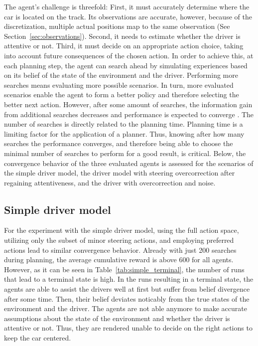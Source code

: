 
The agent's challenge is threefold: First, it must accurately determine where the car is located on the track. Its observations are accurate, however, because of the discretization, multiple actual positions map to the same observation (See Section~\ref{sec:observations}). Second, it needs to estimate whether the driver is attentive or not. Third, it must decide on an appropriate action choice, taking into account future consequences of the chosen action. In order to achieve this, at each planning step, the agent can search ahead by simulating experiences based on its belief of the state of the environment and the driver. Performing more searches means evaluating more possible scenarios. In turn, more evaluated scenarios enable the agent to form a better policy and therefore selecting the better next action. However, after some amount of searches, the information gain from additional searches decreases and performance is expected to converge \parencite{pomcp}. The number of searches is directly related to the planning time. Planning time is a limiting factor for the application of a planner. Thus, knowing after how many searches the performance converges, and therefore being able to choose the minimal number of searches to perform for a good result, is critical. Below, the convergence behavior of the three evaluated agents is assessed for the scenarios of the simple driver model, the driver model with steering overcorrection after regaining attentiveness, and the driver with overcorrection and noise.

\subsection{Simple driver model}

For the experiment with the simple driver model, using the full action space, utilizing only the subset of minor steering actions, and employing preferred actions lead to similar convergence behavior. Already with just 200 searches during planning, the average cumulative reward is above 600 for all agents. However, as it can be seen in Table~\ref{tab:simple_terminal}, the number of runs that lead to a terminal state is high. In the runs resulting in a terminal state, the agents are able to assist the drivers well at first but suffer from belief divergence after some time. Then, their belief deviates noticably from the true states of the environment and the driver. The agents are not able anymore to make accurate assumptions about the state of the environment and whether the driver is attentive or not. Thus, they are rendered unable to decide on the right actions to keep the car centered. 

